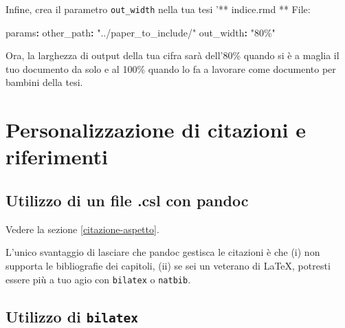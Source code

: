\documentclass[a4paper, 11pt, nobind]{templates/ociamthesis}
\newenvironment{Shaded}{\begin{snugshade}}{\end{snugshade}}
\newcommand{\AttributeTok}[1]{\textcolor[rgb]{0.77,0.63,0.00}{#1}}
\newcommand{\FunctionTok}[1]{\textcolor[rgb]{0.00,0.00,0.00}{#1}}
\newcommand{\InformationTok}[1]{\textcolor[rgb]{0.56,0.35,0.01}{\textbf{\textit{#1}}}}
\newcommand{\KeywordTok}[1]{\textcolor[rgb]{0.13,0.29,0.53}{\textbf{#1}}}
\newcommand{\StringTok}[1]{\textcolor[rgb]{0.31,0.60,0.02}{#1}}
\renewenvironment{Shaded}
{
  \vspace{10pt}%
  \begin{snugshade}%
}{%
  \end{snugshade}%
  \vspace{8pt}%
}
\begin{document}
\begin{Shaded}
\end{Shaded}

Infine, crea il parametro \texttt{out\_width} nella tua tesi '** indice.rmd ** File:

\begin{Shaded}
\begin{Highlighting}[]
\FunctionTok{params}\KeywordTok{:}
\AttributeTok{  }\FunctionTok{other\_path}\KeywordTok{:}\AttributeTok{ }\StringTok{"../paper\_to\_include/"}
\AttributeTok{  }\FunctionTok{out\_width}\KeywordTok{:}\AttributeTok{ }\StringTok{"80\%"}
\end{Highlighting}
\end{Shaded}

Ora, la larghezza di output della tua cifra sarà dell'80\% quando si è a maglia il tuo documento da solo e al 100\% quando lo fa a lavorare come documento per bambini della tesi.

\hypertarget{customising-citations}{%
\section{Personalizzazione di citazioni e riferimenti}\label{customising-citations}}

\hypertarget{utilizzo-di-un-file-.csl-con-pandoc}{%
\subsection{Utilizzo di un file .csl con pandoc}\label{utilizzo-di-un-file-.csl-con-pandoc}}

Vedere la sezione \ref{citazione-aspetto}.

L'unico svantaggio di lasciare che pandoc gestisca le citazioni è che (i) non supporta le bibliografie dei capitoli, (ii) se sei un veterano di LaTeX, potresti essere più a tuo agio con \texttt{bilatex} o \texttt{natbib}.

\hypertarget{bilatex-custom}{%
\subsection{\texorpdfstring{Utilizzo di \texttt{bilatex}}{Utilizzo di bilatex}}\label{bilatex-custom}}
\end{document}
